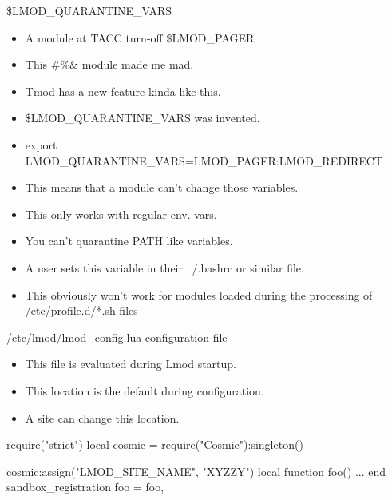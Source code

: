 \documentclass{beamer}
\begin{document}
\begin{frame}{\$LMOD\_QUARANTINE\_VARS}
  \begin{itemize}
    \item A module at TACC turn-off  \$LMOD\_PAGER
    \item This \!\@\#\%\& module made me mad.
    \item Tmod has a new feature kinda like this.
    \item \$LMOD\_QUARANTINE\_VARS was invented.
    \item export LMOD\_QUARANTINE\_VARS=LMOD\_PAGER:LMOD\_REDIRECT
    \item This means that a module can't change those variables.
    \item This only works with regular env. vars.
    \item You can't quarantine PATH like variables.
    \item A user sets this variable in their ~/.bashrc or similar
      file.
    \item This obviously won't work for modules loaded during the
      processing of /etc/profile.d/*.sh files
  \end{itemize}
\end{frame}

\begin{frame}{/etc/lmod/lmod\_config.lua configuration file}
  \begin{itemize}
    \item This file is evaluated during Lmod startup. 
    \item This location is the default during configuration.
    \item A site can change this location.
  \end{itemize}
    {\tiny
\begin{semiverbatim}
    require("strict")
    local cosmic       = require("Cosmic"):singleton()

    cosmic:assign("LMOD_SITE_NAME",   "XYZZY")
    local function foo()
      ...
    end
    sandbox\_registration {
       foo = foo,
    }
\end{semiverbatim}
}
\end{frame}
\end{document}

